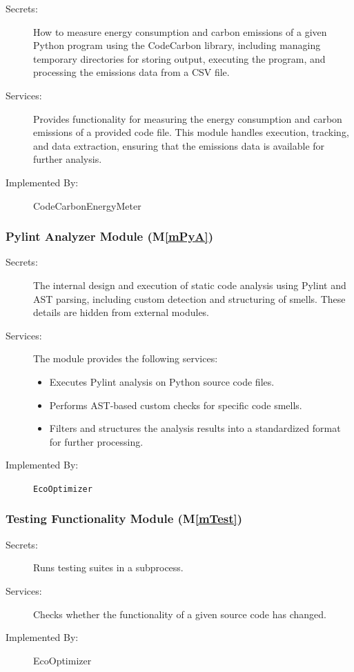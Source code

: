 \documentclass[12pt, titlepage]{article}
\newcommand{\mref}[1]{M\ref{#1}}
\begin{document}
\begin{description}
\item[Secrets:] How to measure energy consumption and carbon emissions of a given Python program using the CodeCarbon library, including managing temporary directories for storing output, executing the program, and processing the emissions data from a CSV file.
\item[Services:] Provides functionality for measuring the energy consumption and carbon emissions of a provided code file. This module handles execution, tracking, and data extraction, ensuring that the emissions data is available for further analysis.
\item[Implemented By:] CodeCarbonEnergyMeter
\end{description}

\subsubsection{Pylint Analyzer Module (\mref{mPyA})}

\begin{description}
\item[Secrets:] The internal design and execution of static code analysis using Pylint and AST parsing, including custom detection and structuring of smells. These details are hidden from external modules.
\item[Services:] The module provides the following services:
  \begin{itemize}
    \item Executes Pylint analysis on Python source code files.
    \item Performs AST-based custom checks for specific code smells.
    \item Filters and structures the analysis results into a standardized format for further processing.
  \end{itemize}
\item[Implemented By:] \texttt{EcoOptimizer}
\end{description}

\subsubsection{Testing Functionality Module (\mref{mTest})}


\begin{description}
    \item[Secrets:] Runs testing suites in a subprocess.
    \item[Services:] Checks whether the functionality of a given source code has changed.
    \item[Implemented By:] EcoOptimizer
\end{description}
\end{document}
